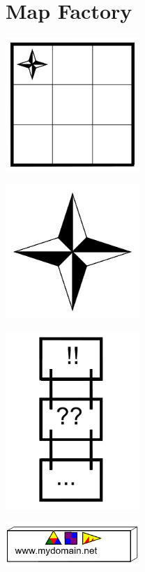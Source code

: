 \documentclass[11pt]{article}
\begin{document}
\section{Map Factory}



\includegraphics[width=2in]{mapfactory_images/map-symbol.png}





\includegraphics[width=2in]{mapfactory_images/mapglyph.png}





\includegraphics[width=2in]{mapfactory_images/sign-symbol.png}





\includegraphics[width=2in]{mapfactory_images/marker-symbol.png}
\end{document}
